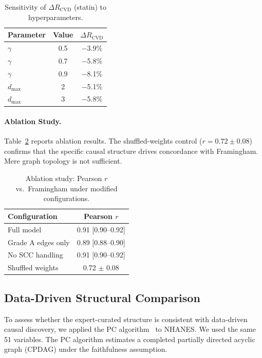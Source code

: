 \documentclass[runningheads]{llncs}
\begin{document}
\renewcommand{\arraystretch}{1.2}
\begin{table}[t]
\centering
\caption{Sensitivity of $\Delta R_{\text{CVD}}$ (statin) to
hyperparameters.}\label{tab:sensitivity}
\small
\begin{tabular}{@{}lcc@{}}
\toprule
\textbf{Parameter} & \textbf{Value} & \textbf{$\Delta R_{\text{CVD}}$} \\
\midrule
$\gamma$ & 0.5 & $-$3.9\% \\
$\gamma$ & 0.7 & $-$5.8\% \\
$\gamma$ & 0.9 & $-$8.1\% \\
$d_{\max}$ & 2 & $-$5.1\% \\
$d_{\max}$ & 3 & $-$5.8\% \\
\bottomrule
\end{tabular}
\end{table}
\renewcommand{\arraystretch}{1.0}

\paragraph{Ablation Study.}\label{sec:ablation}
Table~\ref{tab:ablation} reports ablation results.
The shuffled-weights control ($r = 0.72 \pm 0.08$) confirms that the
specific causal structure drives concordance with Framingham.
Mere graph topology is not sufficient.

\renewcommand{\arraystretch}{1.2}
\begin{table}[t]
\centering
\caption{Ablation study: Pearson $r$ vs.\ Framingham under
modified configurations.}\label{tab:ablation}
\small
\begin{tabular}{@{}lc@{}}
\toprule
\textbf{Configuration} & \textbf{Pearson $r$} \\
\midrule
Full model           & 0.91 [0.90--0.92] \\
Grade A edges only   & 0.89 [0.88--0.90] \\
No SCC handling      & 0.91 [0.90--0.92] \\
Shuffled weights     & 0.72 $\pm$ 0.08 \\
\bottomrule
\end{tabular}
\end{table}
\renewcommand{\arraystretch}{1.0}

\subsection{Data-Driven Structural Comparison}\label{sec:pcalg}

To assess whether the expert-curated structure is consistent with
data-driven causal discovery, we applied the PC
algorithm~\cite{spirtes2000causation} to NHANES.
We used the same 51 variables.
The PC algorithm estimates a completed partially directed acyclic
graph (CPDAG) under the faithfulness assumption.
\end{document}
